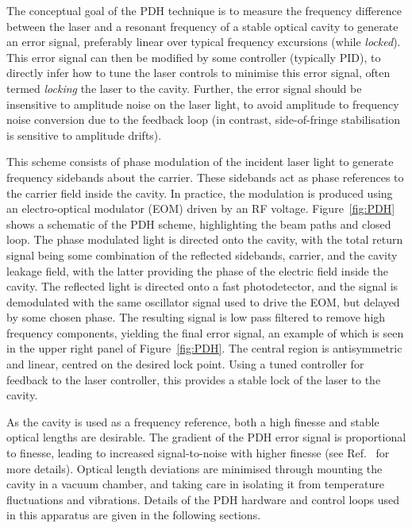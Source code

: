     The conceptual goal of the PDH technique is to measure the frequency difference between the laser and a resonant frequency of a stable optical cavity to generate an error signal, preferably linear over typical frequency excursions (while \emph{locked}). This error signal can then be modified by some controller (typically PID), to directly infer how to tune the laser controls to minimise this error signal, often termed \emph{locking} the laser to the cavity. Further, the error signal should be insensitive to amplitude noise on the laser light, to avoid amplitude to frequency noise conversion due to the feedback loop (in contrast, side-of-fringe stabilisation is sensitive to amplitude drifts).

    This scheme consists of phase modulation of the incident laser light to generate frequency sidebands about the carrier. These sidebands act as phase references to the carrier field inside the cavity. In practice, the modulation is produced using an electro-optical modulator (EOM) driven by an RF voltage.
    Figure~\ref{fig:PDH} shows a schematic of the PDH scheme, highlighting the beam paths and closed loop. The phase modulated light is directed onto the cavity, with the total return signal being some combination of the reflected sidebands, carrier, and the cavity leakage field, with the latter providing the phase of the electric field inside the cavity. The reflected light is directed onto a fast photodetector, and the signal is demodulated with the same oscillator signal used to drive the EOM, but delayed by some chosen phase. The resulting signal is low pass filtered to remove high frequency components, yielding the final error signal, an example of which is seen in the upper right panel of Figure~\ref{fig:PDH}. The central region is antisymmetric and linear, centred on the desired lock point. Using a tuned controller for feedback to the laser controller, this provides a stable lock of the laser to the cavity.

    As the cavity is used as a frequency reference, both a high finesse and stable optical lengths are desirable. The gradient of the PDH error signal is proportional to finesse, leading to increased signal-to-noise with higher finesse (see Ref.~\cite{oswald_characterization_2022} for more details). Optical length deviations are minimised through mounting the cavity in a vacuum chamber, and taking care in isolating it from temperature fluctuations and vibrations. Details of the PDH hardware and control loops used in this apparatus are given in the following sections. 


